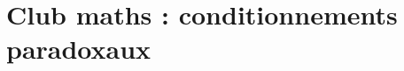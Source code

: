 \documentclass[main.tex]{subfiles}
\begin{document}
\section{Club maths : conditionnements paradoxaux}
%
\end{document}
